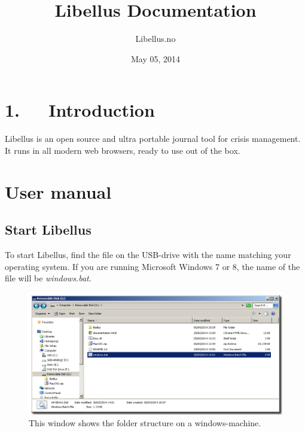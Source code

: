 \documentclass[letterpaper,10pt,english]{sphinxmanual}
\title{Libellus Documentation}
\date{May 05, 2014}
\author{Libellus.no}
\begin{document}
\maketitle
\tableofcontents
{}\label{index::doc}



\chapter{1.   Introduction}
\label{Introduction:introduction}\label{Introduction::doc}\label{Introduction:libellus-1-0-documentation}
Libellus is an open source and ultra portable journal tool for crisis management. It runs in all modern web browsers, ready to use out of the box.


\chapter{User manual}
\label{User manual::doc}\label{User manual:user-manual}

\section{Start Libellus}
\label{User manual:start-libellus}
To start Libellus, find the file on the USB-drive with the name matching your operating system.
If you are running Microsoft Windows 7 or 8, the name of the file will be \emph{windows.bat}.
\begin{figure}[htbp]
\centering
\capstart

\includegraphics{folder.png}
\caption{This window shows the folder structure on a windows-machine.}\end{figure}
\end{document}
